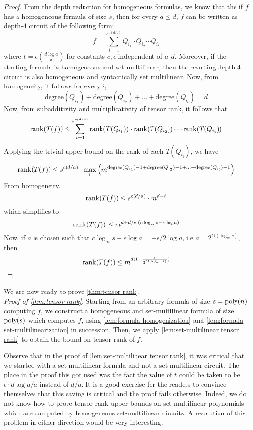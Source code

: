 \begin{proof}
From the depth reduction for homogeneous formulas, we know that the if $f$ has a homogeneous formula of size $s$, then for every $a \leq d$, $f$ can be written as depth-$4$ circuit of the following form:
\[
f = \sum_{i = 1}^{s^{c(d/a)}} Q_{i_1}\cdot Q_{i_2}\cdots Q_{i_t}
\]  
where $t = \epsilon(\frac{d\log a}{a})$ for constants $c, \epsilon$ independent of $a, d$. Moreover, if the starting formula is homogeneous and set multilinear, then the resulting depth-$4$ circuit is also homogeneous and syntactically set multilinear. Now, from homogeneity, it follows for every $i$, 
\[\text{degree}(Q_{i_1}) + \text{degree}(Q_{i_2}) + \ldots + \text{degree}(Q_{i_t}) = d\] 
Now, from subadditivity and multiplicativity of tensor rank, it follows that 
\[
\operatorname{rank}(T(f)) \leq  \sum_{i = 1}^{s^{c(d/a)}} \operatorname{rank} (T(Q_{i_1}))\cdot \operatorname{rank}(T(Q_{i_2}))\cdots \operatorname{rank}(T(Q_{i_t}))
\]
Applying the trivial upper bound on the rank of each $T(Q_{i_j})$, we have 
\[
\operatorname{rank}(T(f)) \leq s^{c(d/a)}\cdot \max_i \left(m^{\text{degree}(Q_{i_1})-1 + \text{degree}(Q_{i_2})-1 + \ldots + \text{degree}(Q_{i_t})-1}\right) 
\]
From homogeneity, 
\[
\operatorname{rank}(T(f)) \leq s^{c(d/a)}\cdot m^{d-t} 
\]
which simplifies to
\[
\operatorname{rank}(T(f)) \leq m^{d + d/a \cdot (c\log_m s - \varepsilon \log a)} 
\]
Now, if $a$ is chosen such that $c\log_m s - \epsilon \log a = -\epsilon/2 \log a$, i.e $a = 2^{O(\log_m s)}$, then  
\[
\operatorname{rank}(T(f)) \leq m^{d( 1- \frac{1}{2^{O(\log_m s)}})} 
\]
\end{proof}

We are now ready to prove \autoref{thm:tensor rank}. \\
{\it Proof of \autoref{thm:tensor rank}.} Starting from an arbitrary formula of size $s = \operatorname{poly}(n)$ computing $f$, we construct a homogeneous and set-multilinear formula of size $\operatorname{poly}(s)$ which computes $f$, using \autoref{lem:formula homogenization} and \autoref{lem:formula set-multilinearization} in succession. Then, we apply \autoref{lem:set-multilinear tensor rank} to obtain the bound on tensor rank of $f$. 
\qedhere


\begin{remark}
Observe that in the proof of \autoref{lem:set-multilinear tensor rank}, it was critical that we started with a set multilinear formula and not a set multilinear circuit. The place in the proof this got used was the fact the value of $t$ could be taken to be $\epsilon \cdot d\log a/a$ instead of $d/a$. It is a good exercise for the readers  to convince themselves that this saving is critical and the proof fails otherwise. Indeed, we do not know how to prove tensor rank upper bounds on set multilinear polynomials which are computed by homogeneous set-multilinear circuits. A resolution of this problem in either direction would be very interesting. 

\end{remark}


